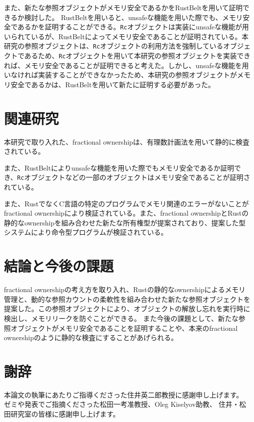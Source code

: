 \documentclass{sumiilab-paper}
\theoremstyle{mystyle}
\numberwithin{definition}{chapter} %
\begin{document}
また、新たな参照オブジェクトがメモリ安全であるかをRustBelt\cite{10.1145/3158154}を用いて証明できるか検討した。
RustBeltを用いると、unsafeな機能を用いた際でも、メモリ安全であるかを証明することができる。\texttt{Rc}オブジェクトは実装にunsafeな機能が用いられているが、RustBeltによってメモリ安全であることが証明されている。本研究の参照オブジェクトは、\texttt{Rc}オブジェクトの利用方法を強制しているオブジェクトであるため、\texttt{Rc}オブジェクトを用いて本研究の参照オブジェクトを実装できれば、メモリ安全であることが証明できると考えた。しかし、unsafeな機能を用いなければ実装することができなかったため、本研究の参照オブジェクトがメモリ安全であるかは、RustBeltを用いて新たに証明する必要があった。

\chapter{関連研究}
本研究で取り入れた、fractional ownership\cite{10.1007/3-540-44898-5_4}は、有理数計画法を用いて静的に検査されている。

また、RustBelt\cite{10.1145/3158154}によりunsafeな機能を用いた際でもメモリ安全であるか証明でき、\texttt{Rc}オブジェクトなどの一部のオブジェクトはメモリ安全であることが証明されている。

また、RustでなくC言語の特定のプログラムでメモリ関連のエラーがないことがfractional ownershipにより検証されている。\cite{10.1007/978-3-642-10672-9_11}また、fractional ownershipとRustの静的なownershipを組み合わせた新たな所有権型が提案されており、提案した型システムにより命令型プログラムが検証されている。\cite{10.1007/978-3-031-50521-8_11}


\chapter{結論と今後の課題}
fractional ownershipの考え方を取り入れ、Rustの静的なownershipによるメモリ管理と、動的な参照カウントの柔軟性を組み合わせた新たな参照オブジェクトを提案した。この参照オブジェクトにより、オブジェクトの解放し忘れを実行時に検出し、メモリリークを防ぐことができる。
また今後の課題として、新たな参照オブジェクトがメモリ安全であることを証明することや、本来のfractional ownershipのように静的な検査にすることがあげられる。

\backmatter%
\chapter{謝辞}
本論文の執筆にあたりご指導くださった住井英二郎教授に感謝申し上げます。
ゼミや発表でご指摘くださった松田一考准教授、Oleg Kiselyov助教、
住井・松田研究室の皆様に感謝申し上げます。



\end{document}
